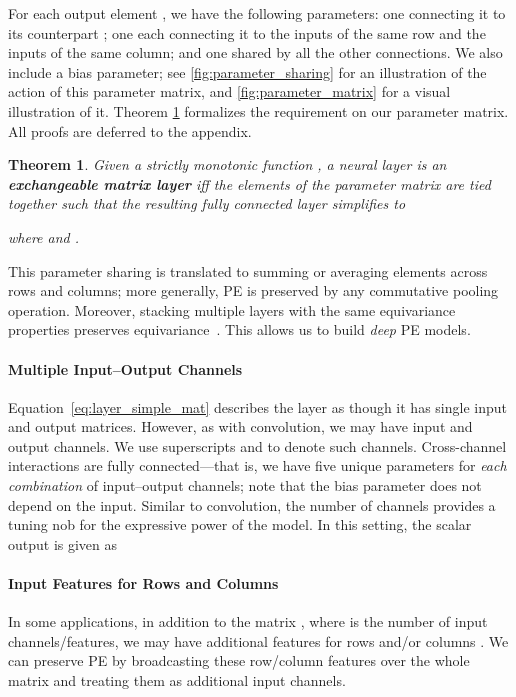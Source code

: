 \documentclass{article}
\newtheorem{theorem}{Theorem}[section]
\theoremstyle{definition}
\begin{document}
For each output element , we have the following parameters: one connecting it to its counterpart ; 
one each connecting it to the inputs of the same row and the inputs of the same column; and one shared by all the other connections. We also include a bias parameter; see \cref{fig:parameter_sharing} for an illustration of the action of this parameter matrix, and \cref{fig:parameter_matrix} for a visual illustration of it. Theorem \ref{thm:pe_layer} formalizes the requirement on our parameter matrix. All proofs are deferred to the appendix. 



\begin{theorem}\label{thm:pe_layer}
Given a strictly monotonic function , a neural layer  is an \textbf{exchangeable matrix layer} \textit{iff} the elements of the parameter matrix  are tied together such that the resulting fully connected layer simplifies to 

where  and .
\end{theorem}
\vspace{-.6em minus .3em}
This parameter sharing is translated to summing or averaging elements across rows and columns; more generally, PE is preserved by any commutative pooling operation.
Moreover, stacking multiple layers with the same equivariance properties
preserves equivariance~\cite{ravanbakhsh_symmetry}. This allows us to build \textit{deep} PE models.

\paragraph{{Multiple Input--Output Channels}}
Equation~\cref{eq:layer_simple_mat} describes the layer as though it has single input and output matrices.
However, as with convolution, we may have  input and  output channels. We use superscripts  and 
to denote such channels. Cross-channel interactions are fully connected---that is, we have five unique parameters  for \textit{each combination}
of input--output channels; note that the bias parameter  does not depend on the input.
Similar to convolution, the number of channels provides a tuning nob for the expressive 
power of the model.
In this setting, the scalar output  is given as
 




\vspace{-.6em minus .3em}\paragraph{{Input Features for Rows and Columns}} 
In some applications, in addition to the matrix , where  is the number of input channels/features, we may have additional features for rows  and/or columns . We can preserve PE by broadcasting these row/column features over the whole matrix and treating them as additional input channels.
\end{document}
